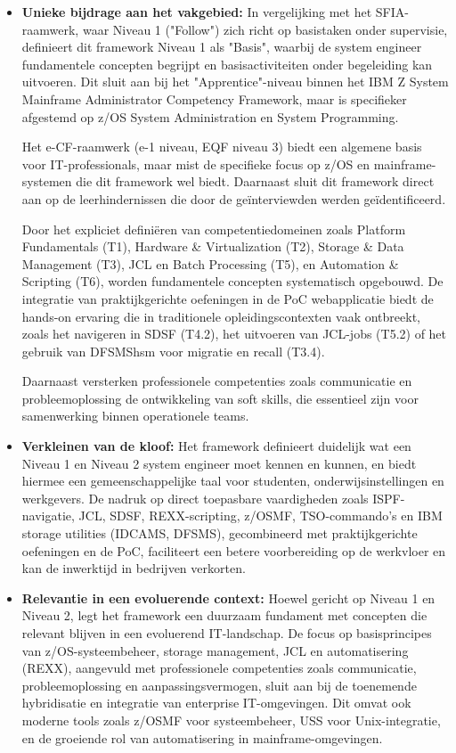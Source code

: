 \begin{itemize}
	\item \textbf{Unieke bijdrage aan het vakgebied:} 
	In vergelijking met het SFIA-raamwerk, waar Niveau 1 ("Follow") zich richt op basistaken onder supervisie, definieert dit framework Niveau 1 als "Basis", waarbij de system engineer fundamentele concepten begrijpt en basisactiviteiten onder begeleiding kan uitvoeren. Dit sluit aan bij het "Apprentice"-niveau binnen het IBM Z System Mainframe Administrator Competency Framework, maar is specifieker afgestemd op z/OS System Administration en System Programming.
	
	Het e-CF-raamwerk (e-1 niveau, EQF niveau 3) biedt een algemene basis voor IT-professionals, maar mist de specifieke focus op z/OS en mainframe-systemen die dit framework wel biedt. Daarnaast sluit dit framework direct aan op de leerhindernissen die door de geïnterviewden werden geïdentificeerd.
	
	Door het expliciet definiëren van competentiedomeinen zoals Platform Fundamentals (T1), Hardware \& Virtualization (T2), Storage \& Data Management (T3), JCL en Batch Processing (T5), en Automation \& Scripting (T6), worden fundamentele concepten systematisch opgebouwd. De integratie van praktijkgerichte oefeningen in de PoC webapplicatie biedt de hands-on ervaring die in traditionele opleidingscontexten vaak ontbreekt, zoals het navigeren in SDSF (T4.2), het uitvoeren van JCL-jobs (T5.2) of het gebruik van DFSMShsm voor migratie en recall (T3.4).
	
	Daarnaast versterken professionele competenties zoals communicatie en probleemoplossing de ontwikkeling van soft skills, die essentieel zijn voor samenwerking binnen operationele teams.
	
	\item \textbf{Verkleinen van de kloof:} 
	Het framework definieert duidelijk wat een Niveau 1 en Niveau 2 system engineer moet kennen en kunnen, en biedt hiermee een gemeenschappelijke taal voor studenten, onderwijsinstellingen en werkgevers. De nadruk op direct toepasbare vaardigheden zoals ISPF-navigatie, JCL, SDSF, REXX-scripting, z/OSMF, TSO-commando's en IBM storage utilities (IDCAMS, DFSMS), gecombineerd met praktijkgerichte oefeningen en de PoC, faciliteert een betere voorbereiding op de werkvloer en kan de inwerktijd in bedrijven verkorten.
	
	\item \textbf{Relevantie in een evoluerende context:} 
	Hoewel gericht op Niveau 1 en Niveau 2, legt het framework een duurzaam fundament met concepten die relevant blijven in een evoluerend IT-landschap. De focus op basisprincipes van z/OS-systeembeheer, storage management, JCL en automatisering (REXX), aangevuld met professionele competenties zoals communicatie, probleemoplossing en aanpassingsvermogen, sluit aan bij de toenemende hybridisatie en integratie van enterprise IT-omgevingen. Dit omvat ook moderne tools zoals z/OSMF voor systeembeheer, USS voor Unix-integratie, en de groeiende rol van automatisering in mainframe-omgevingen.
	
\end{itemize}

